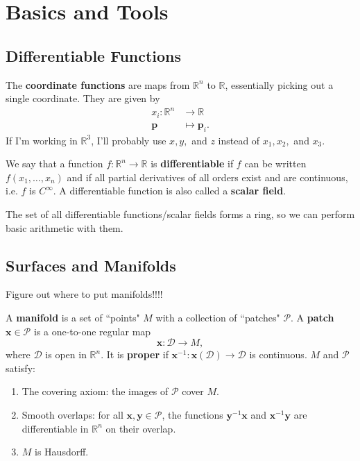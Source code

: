 \documentclass[twoside,10pt]{report}
\begin{document}
\tableofcontents



\chapter{Basics and Tools}


\section{Differentiable Functions}

The \textbf{coordinate functions} are maps from $\mathbb{R}^n$ to $\mathbb{R}$, essentially picking out a single coordinate. They are given by
\begin{align*}
	x_i : \mathbb{R}^n &\to \mathbb{R} \\
	\mathbf{p}&\mapsto \mathbf{p}_i.
\end{align*}
If I'm working in $\mathbb{R}^3$, I'll probably use $x,y,$ and $z$ instead of $x_1, x_2,$ and $x_3$.

We say that a function $f:\mathbb{R}^n \to \mathbb{R}$ is \textbf{differentiable} if $f$ can be written $f(x_1, \dots, x_n)$ and if all partial derivatives of all orders exist and are continuous, i.e. $f$ is $C^{\infty}$. A differentiable function is also called a \textbf{scalar field}.

The set of all differentiable functions/scalar fields forms a ring, so we can perform basic arithmetic with them.


\section{Surfaces and Manifolds}

{\color{red}Figure out where to put manifolds!!!!}

\begin{defn}[]
A \textbf{manifold} is a set of ``points" $M$ with a collection of ``patches" $\mathcal{P}$. A \textbf{patch} $\mathbf{x} \in \mathcal{P}$ is a one-to-one regular map
\[
\mathbf{x}:\mathcal{D}\to M,
\] where $\mathcal{D}$ is open in $\mathbb{R}^n$. {\color{red}It is \textbf{proper} if $\mathbf{x}^{-1}:\mathbf{x}(\mathcal{D})\to \mathcal{D}$ is continuous.} $M$ and $\mathcal{P}$ satisfy:
\begin{enumerate}
	\item The covering axiom: the images of $\mathcal{P}$ cover $M$.
	\item Smooth overlaps: for all $\mathbf{x},\mathbf{y} \in \mathcal{P}$, the functions $\mathbf{y}^{-1}\mathbf{x}$ and $\mathbf{x}^{-1}\mathbf{y}$ are differentiable in $\mathbb{R}^n$ on their overlap.
	\item $M$ is Hausdorff.
\end{enumerate}
\end{defn}
\end{document}
